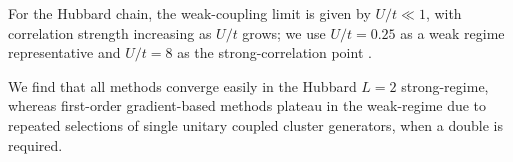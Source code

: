 \documentclass[
  reprint,
  amsmath,
  amssymb,
  aps,
  pra,
  nofootinbib,
  superscriptaddress,
  floatfix
]{revtex4-2}
\begin{document}
For the Hubbard chain, the weak-coupling limit is given by
\(U/t\ll 1\), with correlation strength increasing as \(U/t\) grows;
we use \(U/t=0.25\) as a weak regime representative and \(U/t=8\) as the strong-correlation point
\cite{Arovas2022Hubbard}.  

We find that all methods converge easily in the Hubbard $L=2$ strong-regime, whereas first-order gradient-based methods plateau in the weak-regime due to repeated selections of single unitary coupled cluster generators, when a double is required. 

\end{document}
